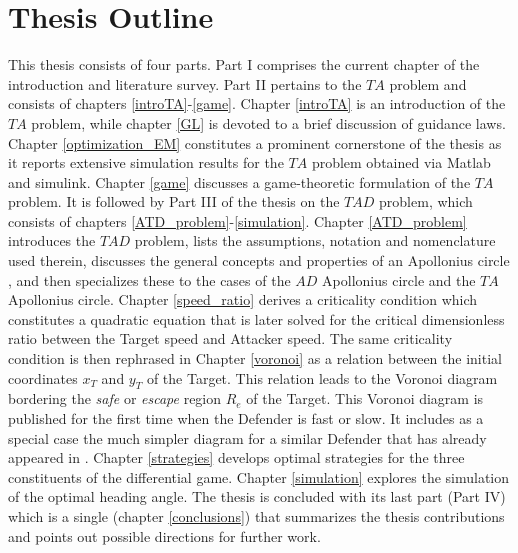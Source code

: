 \bigskip 

\section{Thesis Outline}
This thesis consists of four parts. Part I comprises the current chapter of the introduction and literature survey. Part II pertains to the $ TA $ problem and consists of chapters \ref{introTA}-\ref{game}. Chapter \ref{introTA} is an introduction of the $ TA $ problem, while chapter \ref{GL} is devoted to a brief discussion of guidance laws. Chapter \ref{optimization_EM} constitutes a prominent cornerstone of the thesis as it reports extensive simulation results for the $ TA $ problem obtained via Matlab and simulink. Chapter \ref{game} discusses a game-theoretic formulation of the $ TA $ problem. It is followed by Part III of the thesis on the $ TAD $ problem, which consists of chapters \ref{ATD_problem}-\ref{simulation}. Chapter \ref{ATD_problem} introduces the $ TAD $ problem, lists the assumptions, notation and nomenclature used therein, discusses the general concepts and properties of an Apollonius circle \cite{ayoub2003proving,ayoub2006circle,partensky2008circle,fulton2015conflict}, and then specializes these to the cases of the $AD$ Apollonius circle and the $TA$ Apollonius circle. Chapter \ref{speed_ratio} derives a criticality condition which constitutes a quadratic equation that is later solved for the critical dimensionless ratio between the Target speed and Attacker speed. The same criticality condition is then rephrased in Chapter \ref{voronoi} as a relation between the initial coordinates $x_T$ and $y_T$ of the Target. This relation leads to the Voronoi diagram bordering the \textit{safe} or \textit{escape} region $R_e$ of the Target. This Voronoi diagram is published for the first time when the Defender is fast or slow. It includes as a special case the much simpler diagram for a similar Defender that has already appeared in \cite{garcia2015escape}. Chapter \ref{strategies} develops optimal strategies for the three constituents of the differential game. Chapter \ref{simulation} explores the simulation of the optimal heading angle. The thesis is concluded with its last part (Part IV) which is a single (chapter \ref{conclusions}) that summarizes the thesis contributions and points out possible directions for further work. 
